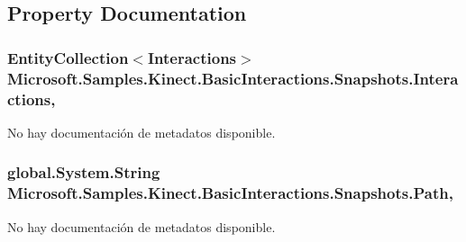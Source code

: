 \subsection{Property Documentation}
\hypertarget{class_microsoft_1_1_samples_1_1_kinect_1_1_basic_interactions_1_1_snapshots_aeafaf65c4f8c7d9106cde5fd43ccd269}{
\subsubsection[{Interactions}]{\setlength{\rightskip}{0pt plus 5cm}Entity\-Collection$<${\bf Interactions}$>$ Microsoft.\-Samples.\-Kinect.\-Basic\-Interactions.\-Snapshots.\-Interactions\hspace{0.3cm}{\ttfamily [get]}, {\ttfamily [set]}}}\label{class_microsoft_1_1_samples_1_1_kinect_1_1_basic_interactions_1_1_snapshots_aeafaf65c4f8c7d9106cde5fd43ccd269}


No hay documentación de metadatos disponible. 

\hypertarget{class_microsoft_1_1_samples_1_1_kinect_1_1_basic_interactions_1_1_snapshots_a8e2d057bb4319f91a172cf43d9160a1b}{
\subsubsection[{Path}]{\setlength{\rightskip}{0pt plus 5cm}global.\-System.\-String Microsoft.\-Samples.\-Kinect.\-Basic\-Interactions.\-Snapshots.\-Path\hspace{0.3cm}{\ttfamily [get]}, {\ttfamily [set]}}}\label{class_microsoft_1_1_samples_1_1_kinect_1_1_basic_interactions_1_1_snapshots_a8e2d057bb4319f91a172cf43d9160a1b}


No hay documentación de metadatos disponible. 

